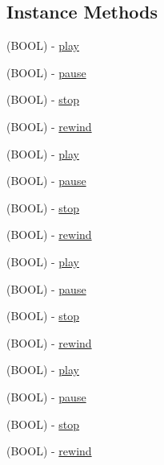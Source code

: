 \subsection*{Instance Methods}
\begin{DoxyCompactItemize}
\item 
(B\+O\+OL) -\/ \hyperlink{protocolCDAudioTransportProtocol_01-p_add4337d3d6e97807d4ca4d7cb91d8832}{play}
\item 
(B\+O\+OL) -\/ \hyperlink{protocolCDAudioTransportProtocol_01-p_aa2b041e3dfcabcd6d142f84593dff3a5}{pause}
\item 
(B\+O\+OL) -\/ \hyperlink{protocolCDAudioTransportProtocol_01-p_a5a69d110348cf35dd25ade6c86bd4b41}{stop}
\item 
(B\+O\+OL) -\/ \hyperlink{protocolCDAudioTransportProtocol_01-p_aba45bf26ae547d54686eef9583f9f2b4}{rewind}
\item 
(B\+O\+OL) -\/ \hyperlink{protocolCDAudioTransportProtocol_01-p_add4337d3d6e97807d4ca4d7cb91d8832}{play}
\item 
(B\+O\+OL) -\/ \hyperlink{protocolCDAudioTransportProtocol_01-p_aa2b041e3dfcabcd6d142f84593dff3a5}{pause}
\item 
(B\+O\+OL) -\/ \hyperlink{protocolCDAudioTransportProtocol_01-p_a5a69d110348cf35dd25ade6c86bd4b41}{stop}
\item 
(B\+O\+OL) -\/ \hyperlink{protocolCDAudioTransportProtocol_01-p_aba45bf26ae547d54686eef9583f9f2b4}{rewind}
\item 
(B\+O\+OL) -\/ \hyperlink{protocolCDAudioTransportProtocol_01-p_add4337d3d6e97807d4ca4d7cb91d8832}{play}
\item 
(B\+O\+OL) -\/ \hyperlink{protocolCDAudioTransportProtocol_01-p_aa2b041e3dfcabcd6d142f84593dff3a5}{pause}
\item 
(B\+O\+OL) -\/ \hyperlink{protocolCDAudioTransportProtocol_01-p_a5a69d110348cf35dd25ade6c86bd4b41}{stop}
\item 
(B\+O\+OL) -\/ \hyperlink{protocolCDAudioTransportProtocol_01-p_aba45bf26ae547d54686eef9583f9f2b4}{rewind}
\item 
(B\+O\+OL) -\/ \hyperlink{protocolCDAudioTransportProtocol_01-p_add4337d3d6e97807d4ca4d7cb91d8832}{play}
\item 
(B\+O\+OL) -\/ \hyperlink{protocolCDAudioTransportProtocol_01-p_aa2b041e3dfcabcd6d142f84593dff3a5}{pause}
\item 
(B\+O\+OL) -\/ \hyperlink{protocolCDAudioTransportProtocol_01-p_a5a69d110348cf35dd25ade6c86bd4b41}{stop}
\item 
(B\+O\+OL) -\/ \hyperlink{protocolCDAudioTransportProtocol_01-p_aba45bf26ae547d54686eef9583f9f2b4}{rewind}
\end{DoxyCompactItemize}


